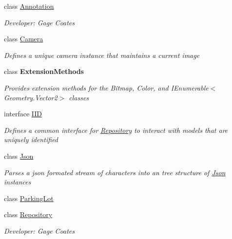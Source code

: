\begin{DoxyCompactItemize}
\item 
class \mbox{\hyperlink{class_eagle_eye_1_1_models_1_1_annotation}{Annotation}}
\begin{DoxyCompactList}\small\item\em Developer\+: Gage Coates \end{DoxyCompactList}\item 
class \mbox{\hyperlink{class_eagle_eye_1_1_models_1_1_camera}{Camera}}
\begin{DoxyCompactList}\small\item\em Defines a unique camera instance that maintains a current image \end{DoxyCompactList}\item 
class {\bfseries Extension\+Methods}
\begin{DoxyCompactList}\small\item\em Provides extension methods for the Bitmap, Color, and I\+Enumerable$<$\+Geometry.\+Vector2$>$ classes \end{DoxyCompactList}\item 
interface \mbox{\hyperlink{interface_eagle_eye_1_1_models_1_1_i_i_d}{I\+ID}}
\begin{DoxyCompactList}\small\item\em Defines a common interface for \mbox{\hyperlink{class_eagle_eye_1_1_models_1_1_repository}{Repository}} to interact with models that are uniquely identified \end{DoxyCompactList}\item 
class \mbox{\hyperlink{class_eagle_eye_1_1_models_1_1_json}{Json}}
\begin{DoxyCompactList}\small\item\em Parses a json formated stream of characters into an tree structure of \mbox{\hyperlink{class_eagle_eye_1_1_models_1_1_json}{Json}} instances \end{DoxyCompactList}\item 
class \mbox{\hyperlink{class_eagle_eye_1_1_models_1_1_parking_lot}{Parking\+Lot}}
\item 
class \mbox{\hyperlink{class_eagle_eye_1_1_models_1_1_repository}{Repository}}
\begin{DoxyCompactList}\small\item\em Developer\+: Gage Coates \end{DoxyCompactList}\end{DoxyCompactItemize}
